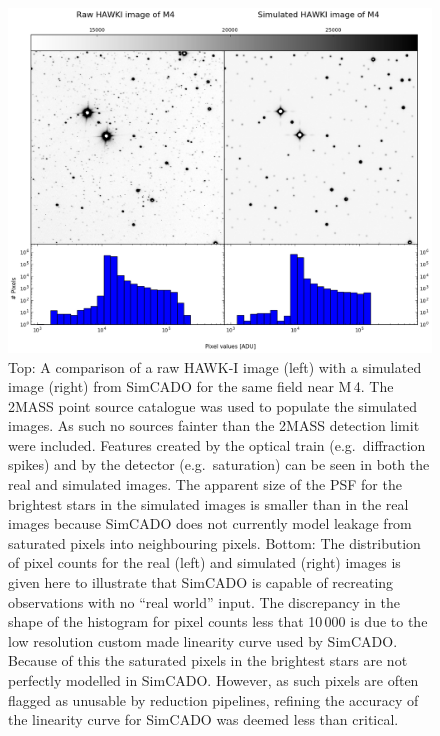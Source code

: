 \begin{figure}

    \centering
    \includegraphics[width=\textwidth]{images/hawki_simcado_side_by_side}
    
    \caption{Top: A comparison of a raw HAWK-I image (left) with a simulated image (right) from SimCADO for the same field near M\,4. The 2MASS point source catalogue was used to populate the simulated images. As such no sources fainter than the 2MASS detection limit were included. Features created by the optical train (e.g.~diffraction spikes) and by the detector (e.g.~saturation) can be seen in both the real and simulated images. The apparent size of the PSF for the brightest stars in the simulated images is smaller than in the real images because SimCADO does not currently model leakage from saturated pixels into neighbouring pixels. Bottom: The distribution of pixel counts for the real (left) and simulated (right) images is given here to illustrate that SimCADO is capable of recreating observations with no ``real world'' input. The discrepancy in the shape of the histogram for pixel counts less that 10\,000 is due to the low resolution custom made linearity curve used by SimCADO. Because of this the saturated pixels in the brightest stars are not perfectly modelled in SimCADO. However, as such pixels are often flagged as unusable by reduction pipelines, refining the accuracy of the linearity curve for SimCADO was deemed less than critical.}
    \label{fig:img_comparison}
    
\end{figure}


